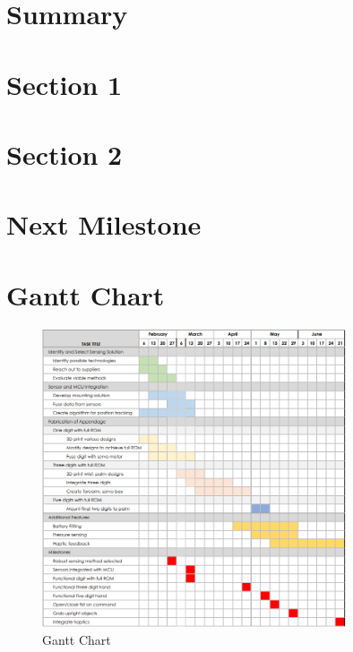 \documentclass{assignment}
\begin{document}

\section*{Summary}

\section*{Section 1}

\section*{Section 2}

\section*{Next Milestone}

\newpage
\section*{Gantt Chart}
\begin{figure}[H]
    \centering
    \includegraphics[width=0.8\textwidth]{GanttChart.png}
    \caption{Gantt Chart}
\end{figure}
\end{document}
